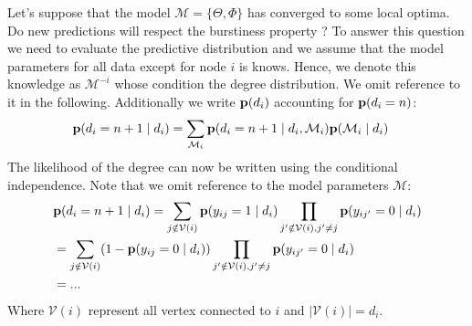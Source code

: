 Let's suppose that the model $\mathcal{M} = \{\Theta, \Phi\}$ has converged to some local optima. Do new predictions will respect the burstiness property ? To answer this question we need to evaluate the predictive distribution and we assume that the model parameters for all data except for node $i$ is knows. Hence, we denote this knowledge as $\mathcal{M}^{-i}$ whose condition the degree distribution. We omit reference to it in the following. Additionally we write $\mathbf{p}(d_i)$ accounting for $\mathbf{p}(d_i=n)$:
\begin{align}
    \mathbf{p}(d_i=n+1 \mid d_i) &= \sum_{\mathcal{M}_i} \mathbf{p}(d_i=n+1 \mid d_i, \mathcal{M}_i) \mathbf{p}(\mathcal{M}_i \mid d_i)
\end{align}
The likelihood of the degree can now be written using the conditional independence. Note that we omit reference to the model parameters $\mathcal{M}$:
\begin{align}
    &\mathbf{p}(d_i=n+1 \mid d_i) = \sum_{j \notin \mathcal{V}(i)} \mathbf{p}(y_{ij} = 1 \mid d_i) \prod_{j'\notin \mathcal{V}(i), j' \neq j} \mathbf{p}(y_{ij'}=0 \mid d_i) \\
    &=  \sum_{j \notin \mathcal{V}(i)} (1 - \mathbf{p}(y_{ij} = 0 \mid d_i) ) \prod_{j'\notin \mathcal{V}(i), j' \neq j} \mathbf{p}(y_{ij'}=0 \mid d_i) \\
    &= ...
\end{align}
Where $\mathcal{V}(i)$ represent all vertex connected to $i$ and $| \mathcal{V}(i) | = d_i$.\\


